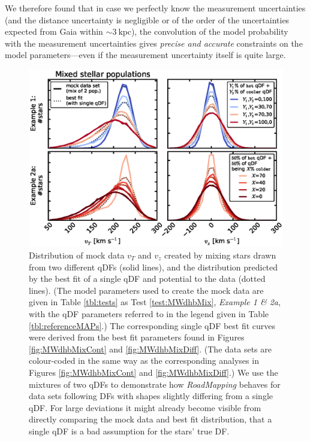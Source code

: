 \documentclass[iop,revtex4,numberedappendix,appendixfloats]{emulateapj}
\newcommand{\RM}{{\sl RoadMapping}}
\begin{document}
We therefore found that in case we perfectly know the measurement uncertainties (and the distance uncertainty is negligible or of the order of the uncertainties expected from Gaia within $\sim3~\text{kpc}$), the convolution of the model probability with the measurement uncertainties gives \emph{precise and accurate} constraints on the model parameters---even if the measurement uncertainty itself is quite large.

\begin{figure}[!htbp]
\centering
\includegraphics[width=\columnwidth]{MWdhbMix_mockdata_residuals.eps}
\caption{Distribution of mock data $v_T$ and $v_z$ created by mixing stars drawn from two different qDFs (solid lines), and the distribution predicted by the best fit of a single qDF and potential to the data (dotted lines). (The model parameters used to create the mock data are given in Table \ref{tbl:tests} as Test \ref{test:MWdhbMix}, \emph{Example 1 \& 2a}, with the qDF parameters referred to in the legend given in Table \ref{tbl:referenceMAPs}.) The corresponding single qDF best fit curves were derived from the best fit parameters found in Figures \ref{fig:MWdhbMixCont} and \ref{fig:MWdhbMixDiff}. (The data sets are colour-coded in the same way as the corresponding analyses in Figures \ref{fig:MWdhbMixCont} and \ref{fig:MWdhbMixDiff}.) We use the mixtures of two qDFs to demonstrate how \RM{} behaves for data sets following DFs with shapes slightly differing from a single qDF. For large deviations it might already become visible from directly comparing the mock data and best fit distribution, that a single qDF is a bad assumption for the stars' true DF.}
\label{fig:MWdhbMix_mockdata_residuals}
\end{figure}
\end{document}
